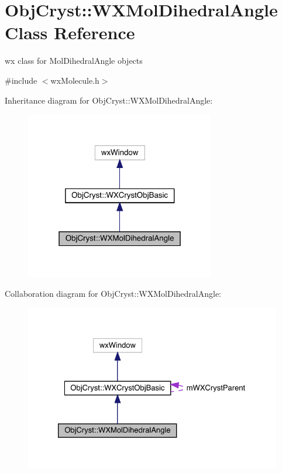 \hypertarget{class_obj_cryst_1_1_w_x_mol_dihedral_angle}{}\section{Obj\+Cryst\+::W\+X\+Mol\+Dihedral\+Angle Class Reference}
\label{class_obj_cryst_1_1_w_x_mol_dihedral_angle}


wx class for Mol\+Dihedral\+Angle objects  




{\ttfamily \#include $<$wx\+Molecule.\+h$>$}



Inheritance diagram for Obj\+Cryst\+::W\+X\+Mol\+Dihedral\+Angle\+:
\nopagebreak
\begin{figure}[H]
\begin{center}
\leavevmode
\includegraphics[width=235pt]{class_obj_cryst_1_1_w_x_mol_dihedral_angle__inherit__graph}
\end{center}
\end{figure}


Collaboration diagram for Obj\+Cryst\+::W\+X\+Mol\+Dihedral\+Angle\+:
\nopagebreak
\begin{figure}[H]
\begin{center}
\leavevmode
\includegraphics[width=326pt]{class_obj_cryst_1_1_w_x_mol_dihedral_angle__coll__graph}
\end{center}
\end{figure}
